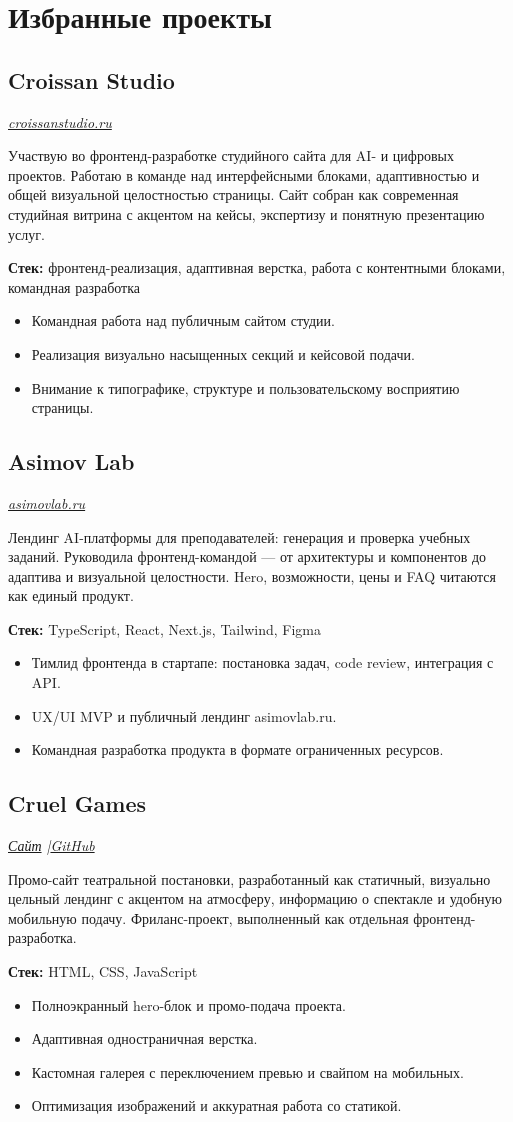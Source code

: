 \documentclass[11pt,a4paper]{article}
\newcommand{\project}[5]{
  \subsection*{#1}
  \textit{#2}

  #3

  \textbf{Стек:} #4

  #5
}
\begin{document}
\section*{Избранные проекты}

\project
{Croissan Studio}
{\href{https://croissanstudio.ru}{croissanstudio.ru}}
{
Участвую во фронтенд-разработке студийного сайта для AI- и цифровых проектов. Работаю в команде над интерфейсными блоками, адаптивностью и общей визуальной целостностью страницы. Сайт собран как современная студийная витрина с акцентом на кейсы, экспертизу и понятную презентацию услуг.
}
{фронтенд-реализация, адаптивная верстка, работа с контентными блоками, командная разработка}
{
\begin{itemize}
  \item Командная работа над публичным сайтом студии.
  \item Реализация визуально насыщенных секций и кейсовой подачи.
  \item Внимание к типографике, структуре и пользовательскому восприятию страницы.
\end{itemize}
}

\project
{Asimov Lab}
{\href{https://asimovlab.ru}{asimovlab.ru}}
{
Лендинг AI-платформы для преподавателей: генерация и проверка учебных заданий. Руководила фронтенд-командой --- от архитектуры и компонентов до адаптива и визуальной целостности. Hero, возможности, цены и FAQ читаются как единый продукт.
}
{TypeScript, React, Next.js, Tailwind, Figma}
{
\begin{itemize}
  \item Тимлид фронтенда в стартапе: постановка задач, code review, интеграция с API.
  \item UX/UI MVP и публичный лендинг asimovlab.ru.
  \item Командная разработка продукта в формате ограниченных ресурсов.
\end{itemize}
}

\project
{Cruel Games}
{\href{https://cruelgames-website.vercel.app/}{Сайт} \quad|\quad \href{https://github.com/natagapova/cruelgames-website}{GitHub}}
{
Промо-сайт театральной постановки, разработанный как статичный, визуально цельный лендинг с акцентом на атмосферу, информацию о спектакле и удобную мобильную подачу. Фриланс-проект, выполненный как отдельная фронтенд-разработка.
}
{HTML, CSS, JavaScript}
{
\begin{itemize}
  \item Полноэкранный hero-блок и промо-подача проекта.
  \item Адаптивная одностраничная верстка.
  \item Кастомная галерея с переключением превью и свайпом на мобильных.
  \item Оптимизация изображений и аккуратная работа со статикой.
\end{itemize}
}
\end{document}
